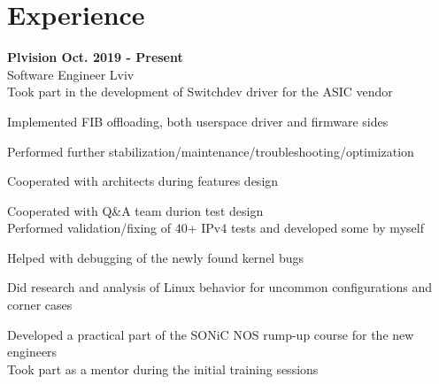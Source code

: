 \documentclass{article}
\begin{document}
\section{Experience}
{\bfseries
Plvision \hspace*{\fill}Oct. 2019 - Present\\
}
\vspace{0.5em}
Software Engineer  \hspace*{\fill}Lviv\\
Took part in the development of Switchdev driver for the ASIC vendor
\begin{description}[align=left,leftmargin=3mm,style=multiline]
\item[-] Implemented FIB offloading, both userspace driver and firmware sides
\item[-] Performed further stabilization/maintenance/troubleshooting/optimization
\item[-] Cooperated with architects during features design
\item[-] Cooperated with Q\&A team durion test design\\
         Performed validation/fixing of 40+ IPv4 tests and developed some by myself
\item[-] Helped with debugging of the newly found kernel bugs
\item[-] Did research and analysis of Linux behavior for uncommon configurations and corner cases
\item[-] Developed a practical part of the SONiC NOS rump-up course for the new engineers \\
         Took part as a mentor during the initial training sessions

\end{description}

\clearpage
\end{document}
